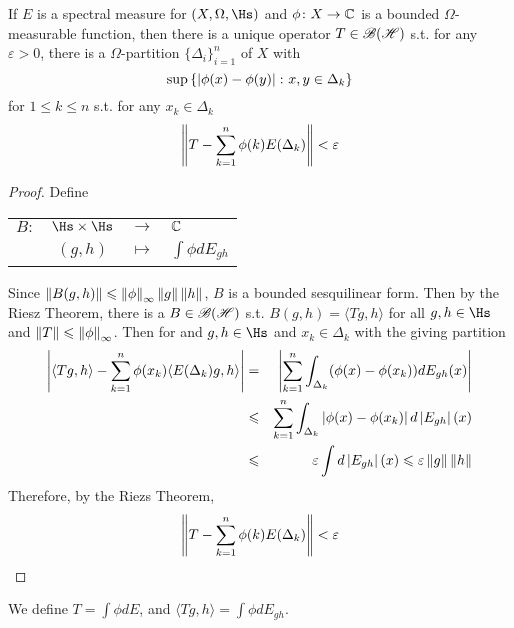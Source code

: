 \begin{thm}
	If $E$ is a spectral measure for $(X,\Omega,\Hs)$ and $\phi \colon X \rightarrow \mathbb{C}$ is a bounded $\Omega$-measurable function, then there is a unique operator $T \in \mathscr{B(H)}$ s.t. for any $\varepsilon > 0$, there is a $\Omega$-partition $\{\Delta_i\}_{i=1}^{n}$ of $X$ with
	\begin{equation*}
		 \sup{\{\left\lvert\phi(x)-\phi(y)\right\lvert \colon x, y \in \Delta_k\}}
	\end{equation*}
	for $1 \leqslant k \leqslant n$ s.t. for any $x_k \in \Delta_k$
	\begin{equation*}
		\left\lVert T-\sum_{k=1}^{n}\phi(k)E(\Delta_k)\right\lVert < \varepsilon
	\end{equation*}
\end{thm}
\begin{proof}
	Define
	\begin{center}
		\begin{tabular}{l c c l}
			$B \colon$ & $\Hs \times \Hs$ & $\longrightarrow$ & $\mathbb{C}$ \\
			~ & $(g,h)$ & $\longmapsto$ & $\int \phi dE_{gh}$
		\end{tabular}
	\end{center}
	Since $\left\lVert B(g,h)\right\lVert \leqslant \left\lVert\phi\right\lVert_{\infty} \left\lVert g\right\lVert \left\lVert h\right\lVert$, $B$ is a bounded sesquilinear form. Then by the Riesz Theorem, there is a $B \in \mathscr{B(H)}$ s.t. $B(g,h) = \langle Tg,h \rangle$ for all $g,h \in \Hs$ and $\left\lVert T\right\lVert \leqslant \left\lVert\phi\right\lVert_{\infty}$. Then for and $g,h \in \Hs$ and $x_k \in \Delta_k$ with the giving partition
	\begin{eqnarray*}
		\left\lvert\langle Tg,h \rangle - \sum_{k=1}^{n}\phi(x_k)\langle E(\Delta_k)g, h \rangle\right\lvert &=& \left\lvert\sum_{k=1}^{n} \int_{\Delta_k} (\phi(x)-\phi(x_k))dE_{gh}(x)\right\lvert \\
		&\leqslant& \sum_{k=1}^{n} \int_{\Delta_k} \left\lvert\phi(x)-\phi(x_k)\right\lvert d\left\lvert E_{gh}\right\lvert(x) \\
		&\leqslant& \varepsilon \int d\left\lvert E_{gh}\right\lvert(x) \leqslant \varepsilon \left\lVert g\right\lVert\left\lVert h\right\lVert
	\end{eqnarray*}
	Therefore, by the Riezs Theorem, 
	\begin{equation*}
		\left\lVert T-\sum_{k=1}^{n}\phi(k)E(\Delta_k)\right\lVert < \varepsilon \qedhere
	\end{equation*}
\end{proof}
\begin{rem}
	We define $T = \int \phi dE$, and $\langle Tg,h \rangle = \int \phi dE_{gh}$.
\end{rem}

